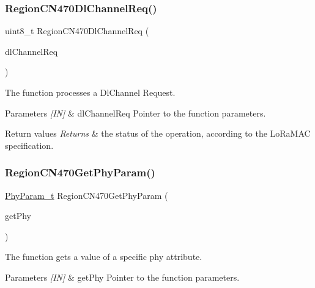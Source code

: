 \subsubsection{\texorpdfstring{Region\+C\+N470\+Dl\+Channel\+Req()}{RegionCN470DlChannelReq()}}
{\footnotesize\ttfamily uint8\+\_\+t Region\+C\+N470\+Dl\+Channel\+Req (\begin{DoxyParamCaption}\item[{\hyperlink{group__REGION_gae0d608ff1f8ea0a430e4f9a4c38ec7f3}{Dl\+Channel\+Req\+Params\+\_\+t} $\ast$}]{dl\+Channel\+Req }\end{DoxyParamCaption})}



The function processes a Dl\+Channel Request. 


\begin{DoxyParams}{Parameters}
{\em \mbox{[}\+I\+N\mbox{]}} & dl\+Channel\+Req Pointer to the function parameters.\\
\hline
\end{DoxyParams}

\begin{DoxyRetVals}{Return values}
{\em Returns} & the status of the operation, according to the Lo\+Ra\+M\+AC specification. \\
\hline
\end{DoxyRetVals}
\mbox{\label{group__REGIONCN470_gaa3f4e59184226b161b9e6880b6e7f204}} 
\subsubsection{\texorpdfstring{Region\+C\+N470\+Get\+Phy\+Param()}{RegionCN470GetPhyParam()}}
{\footnotesize\ttfamily \hyperlink{group__REGION_gaed159b26e5c4677236b6e8677019db30}{Phy\+Param\+\_\+t} Region\+C\+N470\+Get\+Phy\+Param (\begin{DoxyParamCaption}\item[{\hyperlink{group__REGION_gab471483fff904f4f89bbc03f7fc380ab}{Get\+Phy\+Params\+\_\+t} $\ast$}]{get\+Phy }\end{DoxyParamCaption})}



The function gets a value of a specific phy attribute. 


\begin{DoxyParams}{Parameters}
{\em \mbox{[}\+I\+N\mbox{]}} & get\+Phy Pointer to the function parameters.\\
\hline
\end{DoxyParams}

